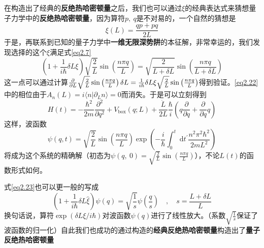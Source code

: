 在构造出了经典的\textbf{反绝热哈密顿量}之后，我们也可以通过$\xi$的经典表达式来猜想量子力学中的\textbf{反绝热哈密顿量}，因为算符$p,\ q$是不对易的，一个自然的猜想是
\begin{equation}
    \xi(L) = \frac{q p + p q}{2 L}
    \label{eq2.21}
\end{equation}
于是，再联系到已知的量子力学中\textbf{一维无限深势阱}的本征解，非常幸运的，我们发现选择的这个$\xi$满足式\ref{eq2.7}
\begin{equation}
    \left(1+\frac{1}{i \hbar} \delta L \xi \right) \sqrt{\frac{2}{L}} \sin \left(\frac{n \pi q}{L}\right)=\sqrt{\frac{2}{L+\delta L}} \sin \left(\frac{n \pi q}{L+\delta L}\right)
    \label{eq2.22}
\end{equation}
这一点可以通过计算$\frac{\partial }{\partial L} \sqrt{\frac{2}{L}} \sin \left(\frac{n \pi q}{L}\right) \delta L = \frac{1}{i \hbar} \delta L \xi \sqrt{\frac{2}{L}} \sin \left(\frac{n \pi q}{L}\right)$得到验证。\ref{eq2.22}中的相位由于$A_{n}(L)=i\langle n | \partial_L  n\rangle = 0$而消失。于是可以立刻得到
\begin{equation}
    H(t)=-\frac{\hbar^{2}}{2 m} \frac{\partial^{2}}{\partial q^{2}}+V_{\mathrm{box}}(q ; L)+\frac{\dot{L}}{2 L} \frac{\hbar}{i}\left(q \frac{\partial}{\partial q}+\frac{\partial}{\partial q} q\right)
    \label{eq2.23}
\end{equation}
这样，波函数
\begin{equation}
    \psi (q, t)=\sqrt{\frac{2}{L}} \sin \left(\frac{n \pi q}{L}\right) \exp \left(-\frac{i}{\hbar} \int_{0}^{t} \mathrm{~d} t^{\prime} \frac{n^{2} \pi^{2} \hbar^{2}}{2 m L^{2}}\right)
    \label{eq2.24}
\end{equation}
将成为这个系统的精确解（初态为$\psi (q,\ 0) = \sqrt{\frac{2}{L}} \sin \left(\frac{n \pi q}{L}\right)$），不论$L(t)$的函数形式如何。

式\ref{eq2.23}也可以更一般的写成
\begin{equation}
    \left(1+\frac{1}{i \hbar} \delta L \hat{\xi}\right) \psi(q)=\sqrt{\frac{1}{s}} \psi\left(\frac{q}{s}\right) \quad, \quad s=\frac{L+\delta L}{L}
    \label{eq2.25}
\end{equation}
换句话说，算符$\exp (\delta L \xi / i \hbar)$对波函数$\psi(q)$进行了线性放大。（系数$\sqrt{\frac{1}{s}}$保证了波函数的归一化）自此我们也成功的通过构造的\textbf{经典反绝热哈密顿量}构造出了\textbf{量子反绝热哈密顿量}

